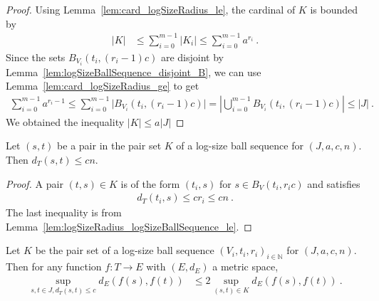 \begin{proof}
Using Lemma~\ref{lem:card_logSizeRadius_le}, the cardinal of $K$ is bounded by
\begin{align*}
  \vert K \vert
  &\le \sum_{i=0}^{m-1} \vert K_i \vert
  \le \sum_{i=0}^{m-1} a^{r_i}
  \: .
\end{align*}
Since the sets $B_{V_i}(t_i, (r_i-1)c)$ are disjoint by Lemma~\ref{lem:logSizeBallSequence_disjoint_B}, we can use Lemma~\ref{lem:card_logSizeRadius_ge} to get
\begin{align*}
  \sum_{i=0}^{m-1} a^{r_i - 1}
  \le \sum_{i=0}^{m-1} \vert B_{V_i}(t_i, (r_i-1)c) \vert
  = \left\vert \bigcup_{i=0}^{m-1} B_{V_i}(t_i, (r_i-1)c) \right\vert
  \le \vert J \vert
  \: .
\end{align*}
We obtained the inequality $\vert K \vert \le a \vert J \vert$
\end{proof}


\begin{lemma}\label{lem:dist_le_of_mem_pairSet}
  \mathlibok
Let $(s, t)$ be a pair in the pair set $K$ of a log-size ball sequence for $(J, a, c, n)$.
Then $d_T(s, t) \le c n$.
\end{lemma}

\begin{proof}
A pair $(t, s) \in K$ is of the form $(t_i, s)$ for $s \in B_V(t_i, r_i c)$ and satisfies
\begin{align*}
  d_T(t_i, s) \le c r_i \le c n \: .
\end{align*}
The last inequality is from Lemma~\ref{lem:logSizeRadius_logSizeBallSequence_le}.
\end{proof}


\begin{lemma}\label{lem:sup_dist_le_two_mul_sup_dist_pairSet}
  \mathlibok
Let $K$ be the pair set of a log-size ball sequence $(V_i, t_i, r_i)_{i \in \mathbb{N}}$ for $(J, a, c, n)$.
Then for any function $f : T \to E$ with $(E,d_E)$ a metric space,
\begin{align*}
  \sup_{s,t\in J, d_T(s,t) \le c} d_E(f(s), f(t))
  & \le 2 \sup_{(s,t) \in K} d_E(f(s), f(t))
  \: .
\end{align*}
\end{lemma}

